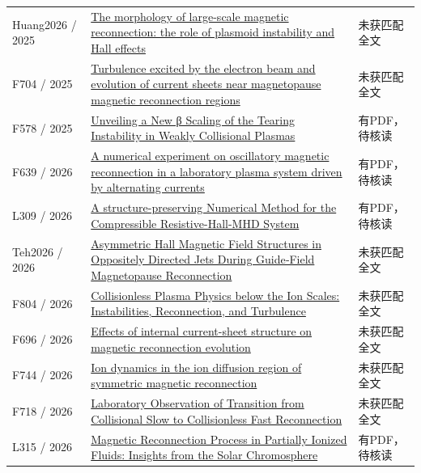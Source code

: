 \begin{longtable}{P{24mm}P{97mm}P{27mm}}
Huang2026 / 2025 & \href{https://doi.org/10.1080/10420150.2025.2598789}{The morphology of large-scale magnetic reconnection: the role of plasmoid instability and Hall effects} & 未获匹配全文\\

F704 / 2025 & \href{https://doi.org/10.1088/1361-6587/adfe19}{Turbulence excited by the electron beam and evolution of current sheets near magnetopause magnetic reconnection regions} & 未获匹配全文\\

F578 / 2025 & \href{https://doi.org/10.3847/1538-4357/ae046e}{Unveiling a New β Scaling of the Tearing Instability in Weakly Collisional Plasmas} & 有PDF，待核读\\

F639 / 2026 & \href{https://doi.org/10.1063/5.0323293}{A numerical experiment on oscillatory magnetic reconnection in a laboratory plasma system driven by alternating currents} & 有PDF，待核读\\

L309 / 2026 & \href{https://arxiv.org/abs/2607.14286}{A structure-preserving Numerical Method for the Compressible Resistive-Hall-MHD System} & 有PDF，待核读\\

Teh2026 / 2026 & \href{https://doi.org/10.1029/2026ja035335}{Asymmetric Hall Magnetic Field Structures in Oppositely Directed Jets During Guide‐Field Magnetopause Reconnection} & 未获匹配全文\\

F804 / 2026 & \href{https://dspace.mit.edu/handle/1721.1/169938}{Collisionless Plasma Physics below the Ion Scales: Instabilities,  Reconnection,  and Turbulence} & 未获匹配全文\\

F696 / 2026 & \href{https://doi.org/10.1088/2058-6272/ae78b7}{Effects of internal current-sheet structure on magnetic reconnection evolution} & 未获匹配全文\\

F744 / 2026 & \href{https://doi.org/10.1063/5.0347826}{Ion dynamics in the ion diffusion region of symmetric magnetic reconnection} & 未获匹配全文\\

F718 / 2026 & \href{https://doi.org/10.1103/9l36-74my}{Laboratory Observation of Transition from Collisional Slow to Collisionless Fast Reconnection} & 未获匹配全文\\

L315 / 2026 & \href{https://doi.org/10.1007/s11207-026-02714-1}{Magnetic Reconnection Process in Partially Ionized Fluids: Insights from the Solar Chromosphere} & 有PDF，待核读\\


\end{longtable}

